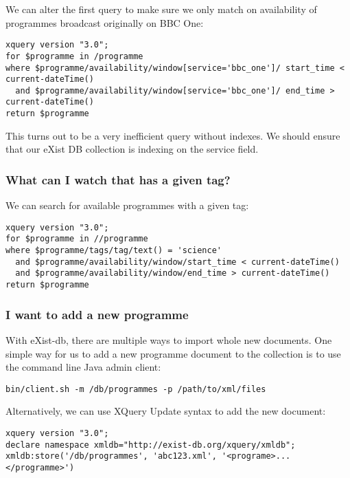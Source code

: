 \documentclass[11pt,a4paper]{article}
\begin{document}
We can alter the first query to make sure we only match on availability of
programmes broadcast originally on BBC One:

\begin{lstlisting}
xquery version "3.0";
for $programme in /programme
where $programme/availability/window[service='bbc_one']/ start_time < current-dateTime()
  and $programme/availability/window[service='bbc_one']/ end_time > current-dateTime()
return $programme
\end{lstlisting}

This turns out to be a very inefficient query without indexes. We should ensure
that our eXist DB collection is indexing on the service field.

\pagebreak

\subsubsection{What can I watch that has a given tag?}

We can search for available programmes with a given tag:

\begin{lstlisting}
xquery version "3.0";
for $programme in //programme
where $programme/tags/tag/text() = 'science'
  and $programme/availability/window/start_time < current-dateTime()
  and $programme/availability/window/end_time > current-dateTime()
return $programme
\end{lstlisting}

\subsubsection{I want to add a new programme}

With eXist-db, there are multiple ways to import whole new documents. One
simple way for us to add a new programme document to the collection
is to use the command line Java admin client:

\begin{lstlisting}
bin/client.sh -m /db/programmes -p /path/to/xml/files
\end{lstlisting}

Alternatively, we can use XQuery Update syntax to add the new document:

\begin{lstlisting}
xquery version "3.0";
declare namespace xmldb="http://exist-db.org/xquery/xmldb";
xmldb:store('/db/programmes', 'abc123.xml', '<programe>...</programme>')
\end{lstlisting}
\end{document}
